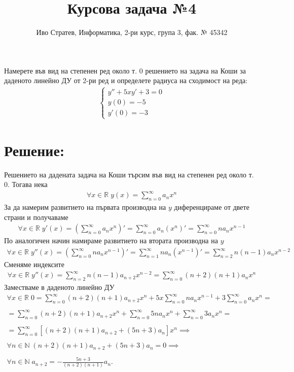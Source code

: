 \documentclass[a4paper,14pt]{extarticle}
\title{Курсова задача №4}
\author{Иво Стратев, Информатика, 2-ри курс, група 3, фак. № 45342}
\newcommand{\R}{\mathbb{R}}
\newcommand{\N}{\mathbb{N}}
\begin{document}
\maketitle
    
Намерете във вид на степенен ред около т. $0$ решението на задача на Коши за даденото линейно
ДУ от 2-ри ред и определете радиуса на сходимост на реда:
\begin{align*}
    \begin{cases}
        y'' + 5xy' + 3 = 0 \\
        y(0) = -5 \\
        y'(0) = -3
    \end{cases}
\end{align*}

\section*{Решение:}
Решението на дадената задача на Коши търсим във вид на степенен ред около т. $0$. Тогава нека
\begin{align*}
    \forall x \in \R \; y(x) = \displaystyle\sum_{n = 0}^\infty a_n x^n
\end{align*}
За да намерим развитието на първата производна на $y$ диференцираме от двете страни и получаваме
\begin{align*}
    \forall x \in \R \; y'(x) = \left(\displaystyle\sum_{n = 0}^\infty a_n x^n\right)' = \displaystyle\sum_{n = 0}^\infty a_n (x^n)' = \displaystyle\sum_{n = 0}^\infty n a_n x^{n - 1}
\end{align*}
По аналогичен начин намираме развитието на втората производна на $y$
\begin{align*}
    \forall x \in \R \; y''(x) = \left(\displaystyle\sum_{n = 0}^\infty n a_n x^{n - 1}\right)' = \displaystyle\sum_{n = 1}^\infty n a_n (x^{n - 1})' = \displaystyle\sum_{n = 2}^\infty n (n - 1) a_n x^{n - 2}
\end{align*}
Сменяме индексите
\begin{align*}
    \forall x \in \R \; y''(x) = \displaystyle\sum_{n = 2}^\infty n (n - 1) a_{n + 2} x^{n - 2} = \displaystyle\sum_{n = 0}^\infty (n + 2) (n + 1) a_n x^n
\end{align*}
Заместваме в даденото линейно ДУ
\begin{align*}
    \forall x \in \R \;  0 = \displaystyle\sum_{n = 0}^\infty (n + 2) (n + 1) a_{n + 2} x^n + 5x\displaystyle\sum_{n = 0}^\infty n a_n x^{n - 1} + 3\displaystyle\sum_{n = 0}^\infty a_n x^n = \\\\
    = \displaystyle\sum_{n = 0}^\infty (n + 2) (n + 1) a_{n + 2} x^n + \displaystyle\sum_{n = 0}^\infty 5 n a_n x^n + \displaystyle\sum_{n = 0}^\infty 3 a_n x^n = \\\\
    = \displaystyle\sum_{n = 0}^\infty [(n + 2) (n + 1) a_{n + 2} + (5n + 3)a_n] x^n \implies \\\\
    \forall n \in \N \; (n + 2) (n + 1) a_{n + 2} + (5n + 3)a_n = 0 \implies \\\\
    \forall n \in \N \; a_{n + 2} = -\frac{5n + 3}{(n + 2) (n + 1)}a_n.
\end{align*}
\end{document}
